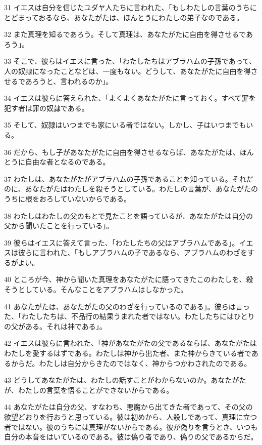 \par 31 イエスは自分を信じたユダヤ人たちに言われた、「もしわたしの言葉のうちにとどまっておるなら、あなたがたは、ほんとうにわたしの弟子なのである。
\par 32 また真理を知るであろう。そして真理は、あなたがたに自由を得させるであろう」。
\par 33 そこで、彼らはイエスに言った、「わたしたちはアブラハムの子孫であって、人の奴隷になったことなどは、一度もない。どうして、あなたがたに自由を得させるであろうと、言われるのか」。
\par 34 イエスは彼らに答えられた、「よくよくあなたがたに言っておく。すべて罪を犯す者は罪の奴隷である。
\par 35 そして、奴隷はいつまでも家にいる者ではない。しかし、子はいつまでもいる。
\par 36 だから、もし子があなたがたに自由を得させるならば、あなたがたは、ほんとうに自由な者となるのである。
\par 37 わたしは、あなたがたがアブラハムの子孫であることを知っている。それだのに、あなたがたはわたしを殺そうとしている。わたしの言葉が、あなたがたのうちに根をおろしていないからである。
\par 38 わたしはわたしの父のもとで見たことを語っているが、あなたがたは自分の父から聞いたことを行っている」。
\par 39 彼らはイエスに答えて言った、「わたしたちの父はアブラハムである」。イエスは彼らに言われた、「もしアブラハムの子であるなら、アブラハムのわざをするがよい。
\par 40 ところが今、神から聞いた真理をあなたがたに語ってきたこのわたしを、殺そうとしている。そんなことをアブラハムはしなかった。
\par 41 あなたがたは、あなたがたの父のわざを行っているのである」。彼らは言った、「わたしたちは、不品行の結果うまれた者ではない。わたしたちにはひとりの父がある。それは神である」。
\par 42 イエスは彼らに言われた、「神があなたがたの父であるならば、あなたがたはわたしを愛するはずである。わたしは神から出た者、また神からきている者であるからだ。わたしは自分からきたのではなく、神からつかわされたのである。
\par 43 どうしてあなたがたは、わたしの話すことがわからないのか。あなたがたが、わたしの言葉を悟ることができないからである。
\par 44 あなたがたは自分の父、すなわち、悪魔から出てきた者であって、その父の欲望どおりを行おうと思っている。彼は初めから、人殺しであって、真理に立つ者ではない。彼のうちには真理がないからである。彼が偽りを言うとき、いつも自分の本音をはいているのである。彼は偽り者であり、偽りの父であるからだ。
